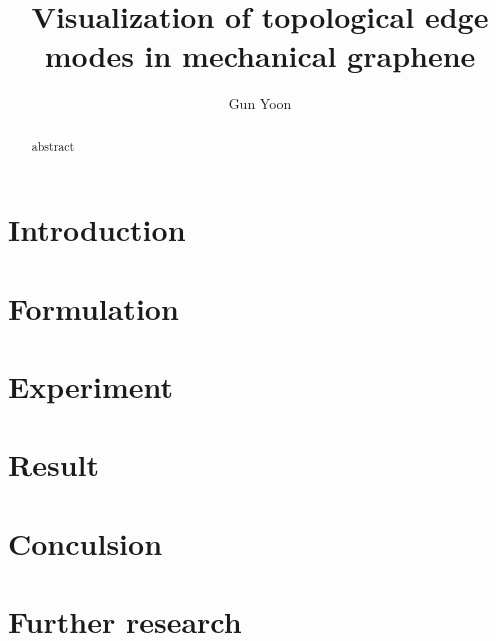 \documentclass[a4paper,10pt]{article}
\title{Visualization of topological edge modes in mechanical graphene}
\author{Gun Yoon}
\begin{document}
\maketitle

\begin{abstract}
    abstract
\end{abstract}

\newpage

    
    \section{Introduction}

    

    \section{Formulation}

    

    \section{Experiment}

    

    \section{Result}

    \section{Conculsion}

    \section{Further research}

    
    

\end{document}
